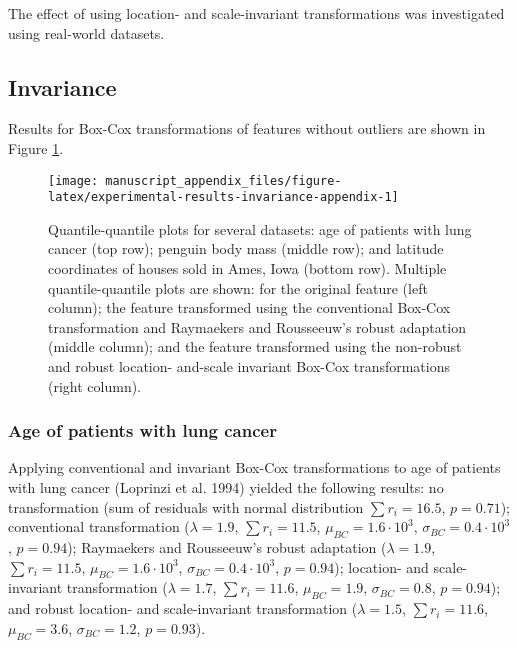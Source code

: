\documentclass[
  a4paper,
]{article}
\begin{document}
The effect of using location- and scale-invariant transformations was
investigated using real-world datasets.

\subsection{Invariance}\label{invariance}

Results for Box-Cox transformations of features without outliers are
shown in Figure \ref{fig:experimental-results-invariance-appendix}.

\begin{figure}

{\centering \texttt{[image: manuscript\_appendix\_files/figure-latex/experimental-results-invariance-appendix-1]} 

}

\caption{Quantile-quantile plots for several datasets: age of patients with lung cancer (top row); penguin body mass (middle row); and latitude coordinates of houses sold in Ames, Iowa (bottom row). Multiple quantile-quantile plots are shown: for the original feature (left column); the feature transformed using the conventional Box-Cox transformation and Raymaekers and Rousseeuw's robust adaptation (middle column); and the feature transformed using the non-robust and robust location- and-scale invariant Box-Cox transformations (right column).}\label{fig:experimental-results-invariance-appendix}
\end{figure}

\subsubsection{Age of patients with lung
cancer}\label{age-of-patients-with-lung-cancer}

Applying conventional and invariant Box-Cox transformations to age of
patients with lung cancer (Loprinzi et al. 1994) yielded the following
results: no transformation (sum of residuals with normal distribution
\(\sum r_i = 16.5\), \(p = 0.71\)); conventional transformation
(\(\lambda = 1.9\), \(\sum r_i = 11.5\), \(\mu_{BC} = 1.6 \cdot 10^3\),
\(\sigma_{BC} = 0.4 \cdot 10^3\), \(p = 0.94\)); Raymaekers and
Rousseeuw's robust adaptation (\(\lambda = 1.9\), \(\sum r_i = 11.5\),
\(\mu_{BC} = 1.6 \cdot 10^3\), \(\sigma_{BC} = 0.4 \cdot 10^3\),
\(p = 0.94\)); location- and scale-invariant transformation
(\(\lambda = 1.7\), \(\sum r_i = 11.6\), \(\mu_{BC} = 1.9\),
\(\sigma_{BC} = 0.8\), \(p = 0.94\)); and robust location- and
scale-invariant transformation (\(\lambda = 1.5\), \(\sum r_i = 11.6\),
\(\mu_{BC} = 3.6\), \(\sigma_{BC} = 1.2\), \(p = 0.93\)).
\end{document}
